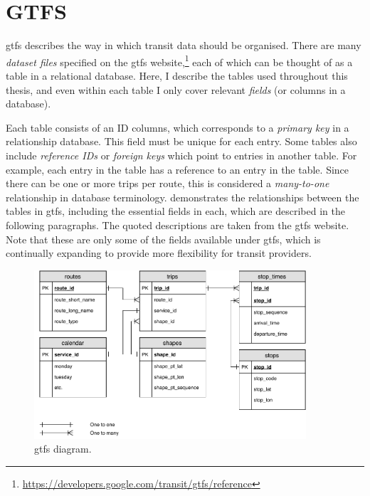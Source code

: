\chapter{GTFS}
\label{app:gtfs}

\Gls{gtfs} \citep{GoogleDevelopers_2006} describes the way in which transit data should be organised. There are many \emph{dataset files} specified on the \gls{gtfs} website,\footnote{\url{https://developers.google.com/transit/gtfs/reference}} each of which can be thought of as a table in a relational database. Here, I describe the tables used throughout this thesis, and even within each table I only cover relevant \emph{fields} (or columns in a database).

Each table consists of an ID columns, which corresponds to a \emph{primary key} in a relationship database. This field must be unique for each entry. Some tables also include \emph{reference IDs} or \emph{foreign keys} which point to entries in another table. For example, each entry in the  table has a reference to an entry in the  table. Since there can be one or more trips per route, this is considered a \emph{many-to-one} relationship in database terminology.  demonstrates the relationships between the tables in \gls{gtfs}, including the essential fields in each, which are described in the following paragraphs. The quoted descriptions are taken from the \gls{gtfs} website. Note that these are only some of the fields available under \gls{gtfs}, which is continually expanding to provide more flexibility for transit providers.

\begin{figure}[tb]
  \centering
  \includegraphics[width=0.9\textwidth]{figure/app_gtfs_diagram.pdf}
  \caption[GTFS diagram]{\gls{gtfs} diagram.}
  \label{fig:gtfs_tables}
\end{figure}

